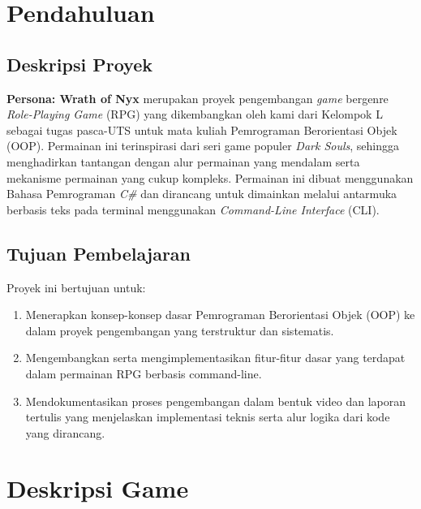 \documentclass[12pt]{article}
\begin{document}
\section{Pendahuluan}
    \subsection{Deskripsi Proyek}
        \textbf{Persona: Wrath of Nyx} merupakan proyek pengembangan \textit{game} bergenre \textit{Role-Playing Game} (RPG) yang dikembangkan oleh kami dari Kelompok L sebagai tugas pasca-UTS untuk mata kuliah Pemrograman Berorientasi Objek (OOP). Permainan ini terinspirasi dari seri game populer \textit{Dark Souls}, sehingga menghadirkan tantangan dengan alur permainan yang mendalam serta mekanisme permainan yang cukup kompleks. Permainan ini dibuat menggunakan Bahasa Pemrograman \textit{C\#} dan dirancang untuk dimainkan melalui antarmuka berbasis teks pada terminal menggunakan \textit{Command-Line Interface} (CLI).
    \subsection{Tujuan Pembelajaran}
        Proyek ini bertujuan untuk:
        \begin{enumerate}
            \item Menerapkan konsep-konsep dasar Pemrograman Berorientasi Objek (OOP) ke dalam proyek pengembangan yang terstruktur dan sistematis.
            \item Mengembangkan serta mengimplementasikan fitur-fitur dasar yang terdapat dalam permainan RPG berbasis command-line.
            \item Mendokumentasikan proses pengembangan dalam bentuk video dan laporan tertulis yang menjelaskan implementasi teknis serta alur logika dari kode yang dirancang.
        \end{enumerate}

\section{Deskripsi Game}    
\end{document}
